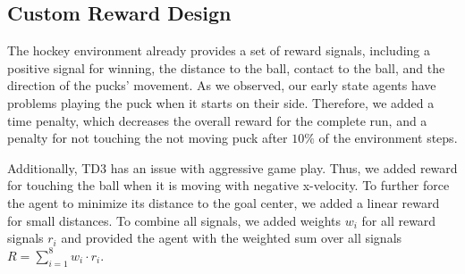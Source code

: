 \subsection{Custom Reward Design} \label{sec:reward}

The hockey environment already provides a set of reward signals, including a positive signal for winning, the distance to the ball, contact to the ball, and the direction of the pucks' movement. As we observed, our early state agents have problems playing the puck when it starts on their side. Therefore, we added  a time penalty, which decreases the overall reward for the complete run, and a penalty for not touching the not moving puck after $10\%$ of the environment steps.

Additionally, \ac{TD3} has an issue with aggressive game play. Thus, we added reward for touching the ball when it is moving with negative x-velocity. To further force the agent to minimize its distance to the goal center, we added a linear reward for small distances. To combine all signals, we added weights $w_i$ for all reward signals $r_i$ and provided the agent with the weighted sum over all signals $R = \sum_{i=1}^8 w_i \cdot r_i$.
